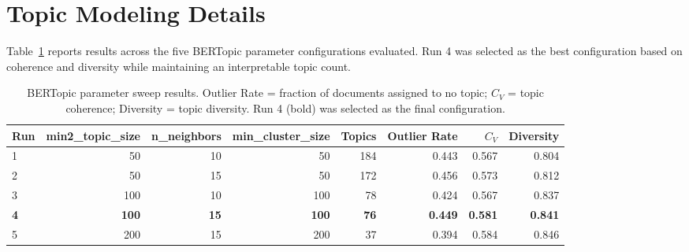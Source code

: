 \documentclass[11pt]{article}
\begin{document}
\appendix

\section{Topic Modeling Details}
\label{sec:appendix-topic-modeling}

Table~\ref{tab:bertopic-sweep} reports results across the five BERTopic parameter configurations evaluated. Run 4 was selected as the best configuration based on coherence and diversity while maintaining an interpretable topic count.

\begin{table}[h]
  \centering
  \small
  \begin{tabular}{lrrrrrrr}
    \toprule
    \textbf{Run} & \textbf{min2\_topic\_size} & \textbf{n\_neighbors} & \textbf{min\_cluster\_size} & \textbf{Topics} & \textbf{Outlier Rate} & \textbf{$C_V$} & \textbf{Diversity} \\
    \midrule
    1 & 50  & 10 & 50  & 184 & 0.443 & 0.567 & 0.804 \\
    2 & 50  & 15 & 50  & 172 & 0.456 & 0.573 & 0.812 \\
    3 & 100 & 10 & 100 & 78  & 0.424 & 0.567 & 0.837 \\
    \textbf{4} & \textbf{100} & \textbf{15} & \textbf{100} & \textbf{76} & \textbf{0.449} & \textbf{0.581} & \textbf{0.841} \\
    5 & 200 & 15 & 200 & 37  & 0.394 & 0.584 & 0.846 \\
    \bottomrule
  \end{tabular}
  \caption{BERTopic parameter sweep results. Outlier Rate = fraction of documents assigned to no topic; $C_V$ = topic coherence; Diversity = topic diversity. Run 4 (bold) was selected as the final configuration.}
  \label{tab:bertopic-sweep}
\end{table}

\end{document}
